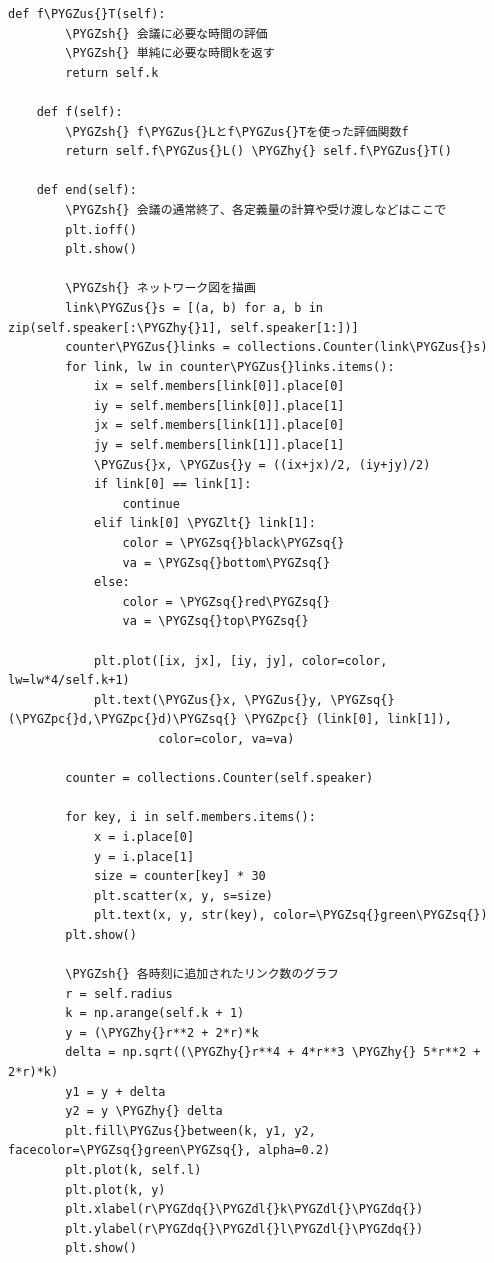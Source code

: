 \documentclass[letterpaper,10pt,english]{sphinxmanual}
\def\PYGZus{\char`\_}
\def\PYGZlt{\char`\<}
\def\PYGZsh{\char`\#}
\def\PYGZpc{\char`\%}
\def\PYGZdl{\char`\$}
\def\PYGZhy{\char`\-}
\def\PYGZsq{\char`\'}
\def\PYGZdq{\char`\"}
\begin{document}
\begin{Verbatim}[commandchars=\\\{\}]
    def f\PYGZus{}T(self):
        \PYGZsh{} 会議に必要な時間の評価
        \PYGZsh{} 単純に必要な時間kを返す
        return self.k

    def f(self):
        \PYGZsh{} f\PYGZus{}Lとf\PYGZus{}Tを使った評価関数f
        return self.f\PYGZus{}L() \PYGZhy{} self.f\PYGZus{}T()

    def end(self):
        \PYGZsh{} 会議の通常終了、各定義量の計算や受け渡しなどはここで
        plt.ioff()
        plt.show()

        \PYGZsh{} ネットワーク図を描画
        link\PYGZus{}s = [(a, b) for a, b in zip(self.speaker[:\PYGZhy{}1], self.speaker[1:])]
        counter\PYGZus{}links = collections.Counter(link\PYGZus{}s)
        for link, lw in counter\PYGZus{}links.items():
            ix = self.members[link[0]].place[0]
            iy = self.members[link[0]].place[1]
            jx = self.members[link[1]].place[0]
            jy = self.members[link[1]].place[1]
            \PYGZus{}x, \PYGZus{}y = ((ix+jx)/2, (iy+jy)/2)
            if link[0] == link[1]:
                continue
            elif link[0] \PYGZlt{} link[1]:
                color = \PYGZsq{}black\PYGZsq{}
                va = \PYGZsq{}bottom\PYGZsq{}
            else:
                color = \PYGZsq{}red\PYGZsq{}
                va = \PYGZsq{}top\PYGZsq{}

            plt.plot([ix, jx], [iy, jy], color=color, lw=lw*4/self.k+1)
            plt.text(\PYGZus{}x, \PYGZus{}y, \PYGZsq{}(\PYGZpc{}d,\PYGZpc{}d)\PYGZsq{} \PYGZpc{} (link[0], link[1]),
                     color=color, va=va)

        counter = collections.Counter(self.speaker)

        for key, i in self.members.items():
            x = i.place[0]
            y = i.place[1]
            size = counter[key] * 30
            plt.scatter(x, y, s=size)
            plt.text(x, y, str(key), color=\PYGZsq{}green\PYGZsq{})
        plt.show()

        \PYGZsh{} 各時刻に追加されたリンク数のグラフ
        r = self.radius
        k = np.arange(self.k + 1)
        y = (\PYGZhy{}r**2 + 2*r)*k
        delta = np.sqrt((\PYGZhy{}r**4 + 4*r**3 \PYGZhy{} 5*r**2 + 2*r)*k)
        y1 = y + delta
        y2 = y \PYGZhy{} delta
        plt.fill\PYGZus{}between(k, y1, y2, facecolor=\PYGZsq{}green\PYGZsq{}, alpha=0.2)
        plt.plot(k, self.l)
        plt.plot(k, y)
        plt.xlabel(r\PYGZdq{}\PYGZdl{}k\PYGZdl{}\PYGZdq{})
        plt.ylabel(r\PYGZdq{}\PYGZdl{}l\PYGZdl{}\PYGZdq{})
        plt.show()


\end{Verbatim}
\end{document}
